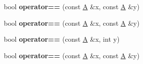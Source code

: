 \begin{DoxyCompactItemize}
bool {\bfseries operator==} (const \mbox{\hyperlink{struct_a}{A}} \&x, const \mbox{\hyperlink{struct_a}{A}} \&y)
\item 
\mbox{\label{struct_a_a59073da68d4f3b056a66a0ee33bed0da}} 
bool {\bfseries operator==} (const \mbox{\hyperlink{struct_a}{A}} \&x, const \mbox{\hyperlink{struct_a}{A}} \&y)
\item 
\mbox{\label{struct_a_a9c0dd5cb20cdd687e831ea2cfa834ed1}} 
bool {\bfseries operator==} (const \mbox{\hyperlink{struct_a}{A}} \&x, int y)
\item 
\mbox{\label{struct_a_a59073da68d4f3b056a66a0ee33bed0da}} 
bool {\bfseries operator==} (const \mbox{\hyperlink{struct_a}{A}} \&x, const \mbox{\hyperlink{struct_a}{A}} \&y)
\end{DoxyCompactItemize}


